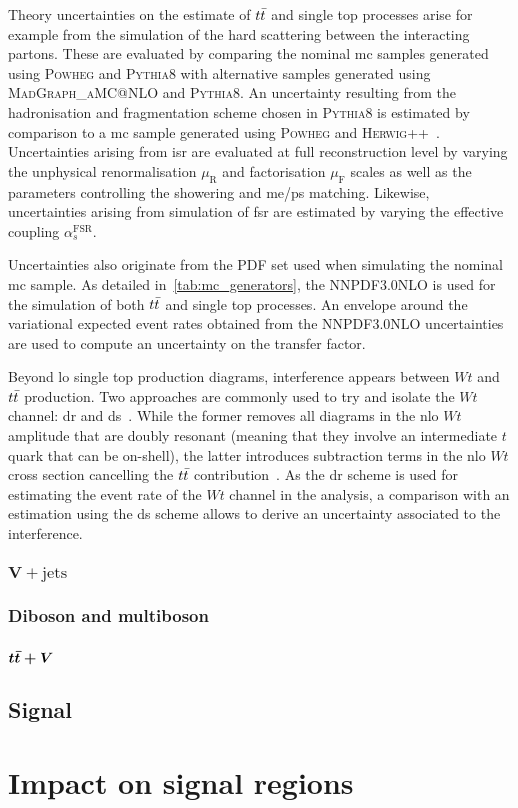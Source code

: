  Theory uncertainties on the estimate of $t\bar{t}$ and single top processes arise for example from the simulation of the hard scattering between the interacting partons. These are evaluated by comparing the nominal \gls{mc} samples generated using \textsc{Powheg} and \textsc{Pythia8} with alternative samples generated using \textsc{MadGraph\_aMC@NLO} and \textsc{Pythia8}. An uncertainty resulting from the hadronisation and fragmentation scheme chosen in \textsc{Pythia8} is estimated by comparison to a \gls{mc} sample generated using \textsc{Powheg} and \textsc{Herwig++}~\cite{Herwig:2015jjp}. Uncertainties arising from \gls{isr} are evaluated at full reconstruction level by varying the unphysical renormalisation $\mu_\mathrm{R}$ and factorisation $\mu_\mathrm{F}$ scales as well as the parameters controlling the showering and \gls{me}/\gls{ps} matching. Likewise, uncertainties arising from simulation of \gls{fsr} are estimated by varying the effective coupling $\alpha_s^{\mathrm{FSR}}$. 
 
 Uncertainties also originate from the \gls{PDF} set used when simulating the nominal \gls{mc} sample. As detailed in~\cref{tab:mc_generators}, the \textsc{NNPDF3.0NLO} is used for the simulation of both $t\bar{t}$ and single top processes. An envelope around the variational expected event rates obtained from the \textsc{NNPDF3.0NLO} uncertainties are used to compute an uncertainty on the transfer factor.
 
 Beyond \gls{lo} single top production diagrams, interference appears between $Wt$ and $t\bar{t}$ production. Two approaches are commonly used to try and isolate the $Wt$ channel: \gls{dr} and \gls{ds}~\cite{Frixione:2008yi}. While the former removes all diagrams in the \gls{nlo} $Wt$ amplitude that are doubly resonant (meaning that they involve an intermediate $t$ quark that can be on-shell), the latter introduces subtraction terms in the \gls{nlo} $Wt$ cross section cancelling the $t\bar{t}$ contribution~\cite{Frixione:2008yi}. As the \gls{dr} scheme is used for estimating the event rate of the $Wt$ channel in the analysis, a comparison with an estimation using the \gls{ds} scheme allows to derive an uncertainty associated to the interference.
  
 \subsubsection{$\boldsymbol{V+\mathrm{jets}}$}
 
 \subsubsection{Diboson and multiboson}
 
 \subsubsection{$\boldsymbol{t\bar{t}+V}$}
 
 \subsection{Signal}
 
 
\section{Impact on signal regions}



